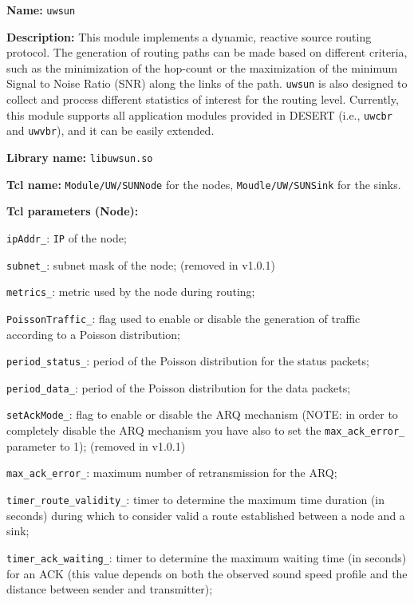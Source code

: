 \vspace{1 cm}

\begin{description}
   \item {\bf Name:} {\tt uwsun}
   \item {\bf Description:} This module implements a dynamic, reactive source routing protocol. The generation of routing paths can be made based on different criteria, such as the minimization of the hop-count or the maximization of the minimum Signal to Noise Ratio (SNR) along the links of the path. {\tt uwsun} is also designed to collect and process different statistics of interest for the routing level. Currently, this module supports all application modules provided in DESERT (i.e., {\tt uwcbr} and {\tt uwvbr}), and it can be easily extended. 
   \item {\bf Library name:} {\tt libuwsun.so}
   \item {\bf Tcl name:} {\tt Module/UW/SUNNode} for the nodes, {\tt Moudle/UW/SUNSink} for the sinks.
   \item {\bf Tcl parameters (Node):}
   \begin{description}
   	 \item {\tt ipAddr\_}: {\tt IP} of the node;
   	 \item {\tt subnet\_}: subnet mask of the node; (removed in v1.0.1)
 	 \item {\tt metrics\_}: metric used by the node during routing;
 	 \item {\tt PoissonTraffic\_}: flag used to enable or disable the generation of traffic according to a Poisson distribution;
 	 \item {\tt period\_status\_}: period of the Poisson distribution for the status packets;
 	 \item {\tt period\_data\_}: period of the Poisson distribution for the data packets;
 	 \item {\tt setAckMode\_}: flag to enable or disable the ARQ mechanism (NOTE: in order to completely disable the ARQ mechanism you have also to set the {\tt max\_ack\_error\_} parameter to 1); (removed in v1.0.1)
 	 \item {\tt max\_ack\_error\_}: maximum number of retransmission for the ARQ;
 	 \item {\tt timer\_route\_validity\_}: timer to determine the maximum time duration (in seconds) during which to consider valid a route established between a node and a sink;
 	 \item {\tt timer\_ack\_waiting\_}: timer to determine the maximum waiting time (in seconds) for an ACK (this value depends on both the observed sound speed profile and the distance between sender and transmitter);

\end{description}
\end{description}
